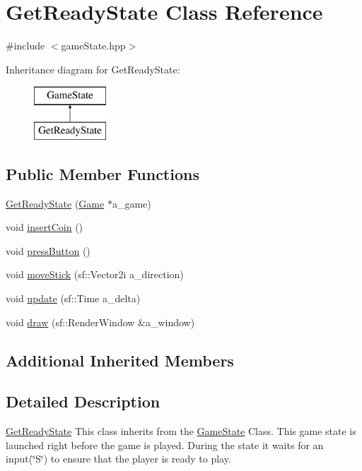 \hypertarget{class_get_ready_state}{}\section{Get\+Ready\+State Class Reference}
\label{class_get_ready_state}


{\ttfamily \#include $<$game\+State.\+hpp$>$}

Inheritance diagram for Get\+Ready\+State\+:\begin{figure}[H]
\begin{center}
\leavevmode
\includegraphics[height=2.000000cm]{class_get_ready_state}
\end{center}
\end{figure}
\subsection*{Public Member Functions}
\begin{DoxyCompactItemize}
\item 
\hyperlink{class_get_ready_state_a227e45622dad03369a88024b54df0e92}{Get\+Ready\+State} (\hyperlink{class_game}{Game} $\ast$a\+\_\+game)
\item 
void \hyperlink{class_get_ready_state_afac1da927d38cf32960f2370856ec9f6}{insert\+Coin} ()
\item 
void \hyperlink{class_get_ready_state_a414a505ec783b1bf577b1b859abaee46}{press\+Button} ()
\item 
void \hyperlink{class_get_ready_state_a0a7f1548b4c58e8bd5634ceb59ba7b9b}{move\+Stick} (sf\+::\+Vector2i a\+\_\+direction)
\item 
void \hyperlink{class_get_ready_state_a6e5a1035b4ee7a52aa28027a0b99dd8a}{update} (sf\+::\+Time a\+\_\+delta)
\item 
void \hyperlink{class_get_ready_state_a5526ece0f8f8becab78b78fbc7919045}{draw} (sf\+::\+Render\+Window \&a\+\_\+window)
\end{DoxyCompactItemize}
\subsection*{Additional Inherited Members}


\subsection{Detailed Description}
\hyperlink{class_get_ready_state}{Get\+Ready\+State} This class inherits from the \hyperlink{class_game_state}{Game\+State} Class. This game state is launched right before the game is played. During the state it waits for an input(\char`\"{}\+S\char`\"{}) to ensure that the player is ready to play. 

